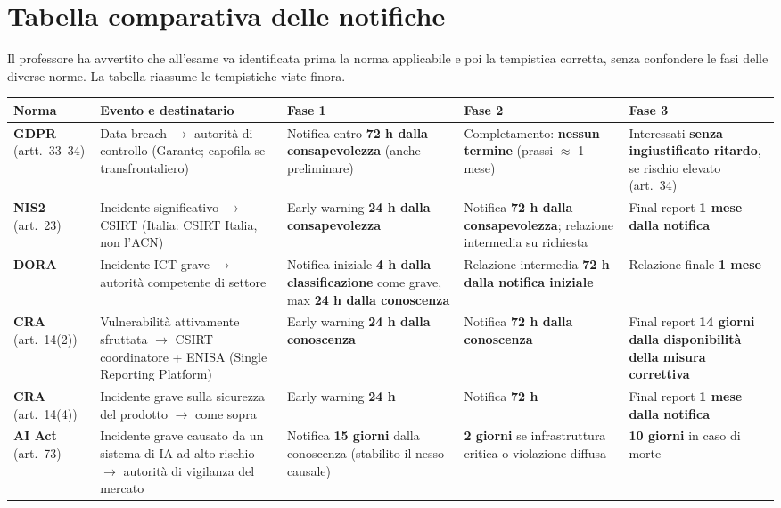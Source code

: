 \chapter{Tabella comparativa delle notifiche}
\label{cap:scadenze}

Il professore ha avvertito che all'esame va identificata prima la norma applicabile e poi la
tempistica corretta, senza confondere le fasi delle diverse norme. La tabella riassume le
tempistiche viste finora.

\begin{center}
\small
\begin{tabularx}{\linewidth}{>{\raggedright\arraybackslash}p{1.7cm}
  >{\raggedright\arraybackslash}X >{\raggedright\arraybackslash}X
  >{\raggedright\arraybackslash}X >{\raggedright\arraybackslash}X}
\toprule
\textbf{Norma} & \textbf{Evento e destinatario} & \textbf{Fase 1} & \textbf{Fase 2} & \textbf{Fase 3} \\
\midrule
\textbf{GDPR} (artt.~33--34)
  & Data breach $\rightarrow$ autorità di controllo (Garante; capofila se transfrontaliero)
  & Notifica entro \textbf{72 h dalla consapevolezza} (anche preliminare)
  & Completamento: \textbf{nessun termine} (prassi $\approx$ 1 mese)
  & Interessati \textbf{senza ingiustificato ritardo}, se rischio elevato (art.~34) \\
\midrule
\textbf{NIS2} (art.~23)
  & Incidente significativo $\rightarrow$ CSIRT (Italia: CSIRT Italia, non l'ACN)
  & Early warning \textbf{24 h dalla consapevolezza}
  & Notifica \textbf{72 h dalla consapevolezza}; relazione intermedia su richiesta
  & Final report \textbf{1 mese dalla notifica} \\
\midrule
\textbf{DORA}
  & Incidente ICT grave $\rightarrow$ autorità competente di settore
  & Notifica iniziale \textbf{4 h dalla classificazione} come grave, max \textbf{24 h dalla conoscenza}
  & Relazione intermedia \textbf{72 h dalla notifica iniziale}
  & Relazione finale \textbf{1 mese} \\
\midrule
\textbf{CRA} (art.~14(2))
  & Vulnerabilità attivamente sfruttata $\rightarrow$ CSIRT coordinatore + ENISA (Single Reporting Platform)
  & Early warning \textbf{24 h dalla conoscenza}
  & Notifica \textbf{72 h dalla conoscenza}
  & Final report \textbf{14 giorni dalla disponibilità della misura correttiva} \\
\midrule
\textbf{CRA} (art.~14(4))
  & Incidente grave sulla sicurezza del prodotto $\rightarrow$ come sopra
  & Early warning \textbf{24 h}
  & Notifica \textbf{72 h}
  & Final report \textbf{1 mese dalla notifica} \\
\midrule
\textbf{AI Act} (art.~73)
  & Incidente grave causato da un sistema di IA ad alto rischio $\rightarrow$ autorità di vigilanza del mercato
  & Notifica \textbf{15 giorni} dalla conoscenza (stabilito il nesso causale)
  & \textbf{2 giorni} se infrastruttura critica o violazione diffusa
  & \textbf{10 giorni} in caso di morte \\
\bottomrule
\end{tabularx}
\end{center}


